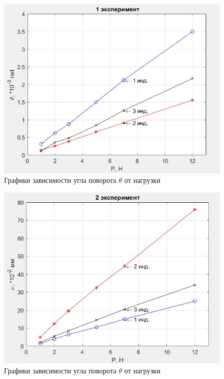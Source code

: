 \documentclass[12pt, a4paper]{article}
\begin{document}
\begin{figure}[h]
\centering
\includegraphics[width = 15cm]{teta_1.jpg}
\caption{Графики зависимости угла поворота $\theta$ от нагрузки}
\label{theta_levoe}
\end{figure}

\begin{figure}[h]
\centering
\includegraphics[width = 15cm]{nu_2.jpg}
\caption{Графики зависимости угла поворота $\theta$ от нагрузки}
\label{theta_pravoe}
\end{figure}
\end{document}
